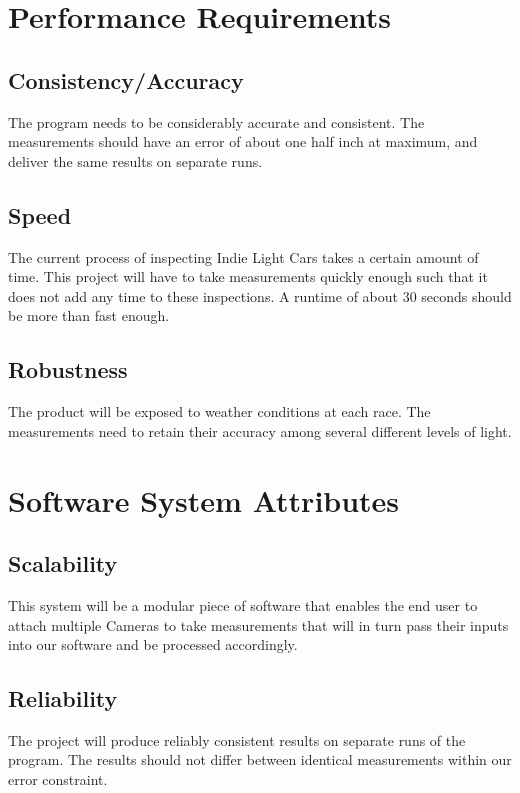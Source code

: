 \documentclass[onecolumn, draftclsnofoot,10pt, compsoc]{IEEEtran}
\begin{document}
\section{Performance Requirements}
\subsection{Consistency/Accuracy}
The program needs to be considerably accurate and consistent.  The measurements should have an error of about one half inch at maximum, and deliver the same results on separate runs.
\subsection{Speed}
The current process of inspecting Indie Light Cars takes a certain amount of time.  This project will have to take measurements quickly enough such that it does not add any time to these inspections.  A runtime of about 30 seconds should be more than fast enough.
\subsection{Robustness}
The product will be exposed to weather conditions at each race.  The measurements need to retain their accuracy among several different levels of light.


\section{Software System Attributes}
\subsection{Scalability}
This system will be a modular piece of software that enables the end user to attach multiple Cameras to take measurements that will in turn pass their inputs into our software and be processed accordingly.
\subsection{Reliability}
The project will produce reliably consistent results on separate runs of the program.  The results should not differ between identical measurements within our error constraint. 
\end{document}
